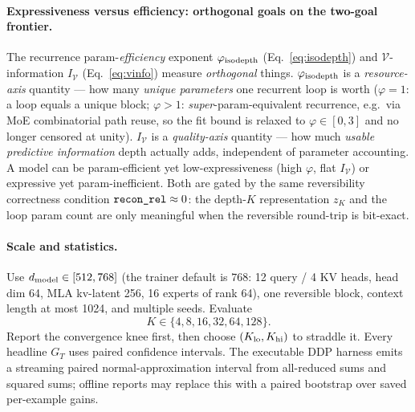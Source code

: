 \documentclass[11pt]{article}
\newcommand{\code}[1]{\texttt{#1}}
\begin{document}
\paragraph{Expressiveness versus efficiency: orthogonal goals on the two-goal frontier.}
The recurrence param-\emph{efficiency} exponent \(\varphi_{\rm isodepth}\) (Eq.~\eqref{eq:isodepth}) and
\(\mathcal{V}\)-information \(I_{\mathcal{V}}\) (Eq.~\eqref{eq:vinfo}) measure \emph{orthogonal} things.
\(\varphi_{\rm isodepth}\) is a \emph{resource-axis} quantity --- how many \emph{unique parameters} one
recurrent loop is worth (\(\varphi=1\): a loop equals a unique block; \(\varphi>1\):
\emph{super}-param-equivalent recurrence, e.g.\ via MoE combinatorial path reuse, so the fit bound is
relaxed to \(\varphi\in[0,3]\) and no longer censored at unity).  \(I_{\mathcal{V}}\) is a
\emph{quality-axis} quantity --- how much \emph{usable predictive information} depth actually adds,
independent of parameter accounting.  A model can be param-efficient yet low-expressiveness (high
\(\varphi\), flat \(I_{\mathcal{V}}\)) or expressive yet param-inefficient.  Both are gated by the same
reversibility correctness condition \(\code{\detokenize{recon_rel}}\approx0\): the depth-\(K\)
representation \(z_K\) and the loop param count are only meaningful when the reversible round-trip is
bit-exact.

\paragraph{Scale and statistics.}
Use \(d_{\rm model}\in[512,768]\) (the trainer default is \(768\): 12 query / 4 KV heads,
head dim 64, MLA kv-latent 256, 16 experts of rank 64), one reversible block, context length at
most 1024, and multiple seeds.  Evaluate
\[
  K\in\{4,8,16,32,64,128\}.
\]
Report the convergence knee first, then choose \((K_{\rm lo},K_{\rm hi})\) to straddle it.  Every
headline \(G_T\) uses paired confidence intervals.  The executable DDP harness emits a streaming
paired normal-approximation interval from all-reduced sums and squared sums; offline reports may
replace this with a paired bootstrap over saved per-example gains.
\end{document}
